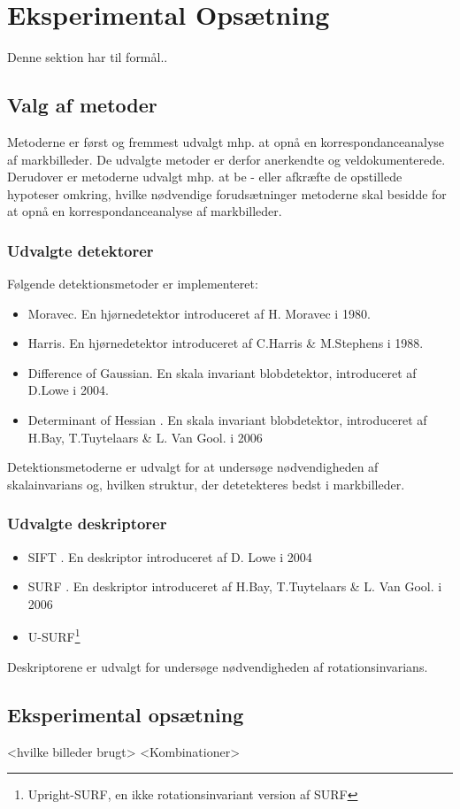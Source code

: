 \chapter{Eksperimental Opsætning}
Denne sektion har til formål..
\section{Valg af metoder}
Metoderne er først og fremmest udvalgt mhp. at opnå en korrespondanceanalyse af markbilleder. De udvalgte metoder er derfor anerkendte og veldokumenterede. Derudover er metoderne udvalgt mhp. at be - eller afkræfte de opstillede hypoteser omkring, hvilke nødvendige forudsætninger metoderne skal besidde for at opnå en korrespondanceanalyse af markbilleder.
\subsection{Udvalgte detektorer}
Følgende detektionsmetoder er implementeret:
\begin{itemize}
\item{Moravec\cite{moravec}. En hjørnedetektor introduceret af H. Moravec i 1980.}
\item{Harris\cite{harris}. En hjørnedetektor introduceret af C.Harris \& M.Stephens i 1988.}
\item{Difference of Gaussian\cite{SIFT}. En skala invariant blobdetektor, introduceret af D.Lowe i 2004.}
\item{Determinant of Hessian \cite{SURF}. En skala invariant blobdetektor, introduceret af H.Bay, T.Tuytelaars \& L. Van Gool. i 2006}
\end{itemize}
Detektionsmetoderne er udvalgt for at undersøge nødvendigheden af skalainvarians og, hvilken struktur, der detetekteres bedst i markbilleder.
\subsection{Udvalgte deskriptorer}
\begin{itemize}
\item{SIFT \cite{SIFT}. En deskriptor introduceret af D. Lowe i 2004}
\item{SURF \cite{SURF}. En deskriptor introduceret af  H.Bay, T.Tuytelaars \& L. Van Gool. i 2006}
\item{U-SURF\footnote{Upright-SURF, en ikke rotationsinvariant version af SURF}} 
\end{itemize}
Deskriptorene er udvalgt for undersøge nødvendigheden af rotationsinvarians.
\section{Eksperimental opsætning}
<hvilke billeder brugt>
<Kombinationer>